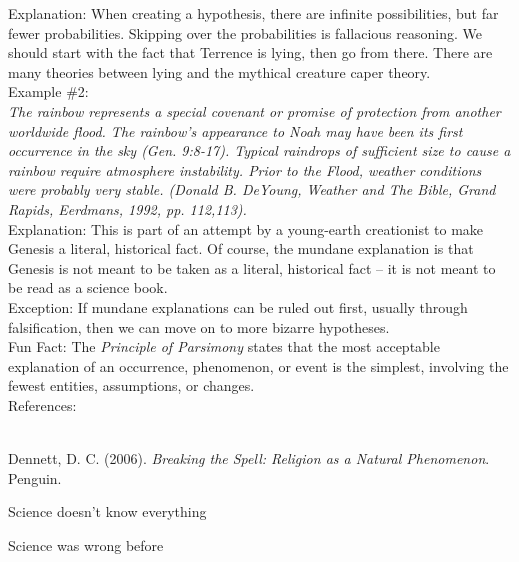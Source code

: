 \documentclass[a4paper,12pt,single,pdftex]{scrbook}
\begin{document}
    
      Explanation: When creating a hypothesis, there are infinite possibilities, but far fewer probabilities.  Skipping over the probabilities is fallacious reasoning.  We should start with the fact that Terrence is lying, then go from there.  There are many theories between lying and the mythical creature caper theory.
    \\

    
      Example \#2:
    \\

    
      {\em The rainbow represents a special covenant or promise of protection from another worldwide flood. The rainbow's appearance to Noah may have been its first occurrence in the sky (Gen. 9:8-17). Typical raindrops of sufficient size to cause a rainbow require atmosphere instability. Prior to the Flood, weather conditions were probably very stable. (Donald B. DeYoung, Weather and The Bible, Grand Rapids, Eerdmans, 1992, pp. 112,113).}
    \\

    
      Explanation: This is part of an attempt by a young-earth creationist to make Genesis a literal, historical fact.  Of course, the mundane explanation is that Genesis is not meant to be taken as a literal, historical fact -- it is not meant to be read as a science book.
    \\

    
      Exception: If mundane explanations can be ruled out first, usually through falsification, then we can move on to more bizarre hypotheses.
    \\

    
      Fun Fact: The {\em Principle of Parsimony} states that the most acceptable explanation of an occurrence, phenomenon, or event is the simplest, involving the fewest entities, assumptions, or changes.
    \\

    References:

    
      
        
      \\

      
        
          Dennett, D. C. (2006). {\it Breaking the Spell: Religion as a Natural Phenomenon}. Penguin.
        
      
    
  

Science doesn't know everything

Science was wrong before
\end{document}
